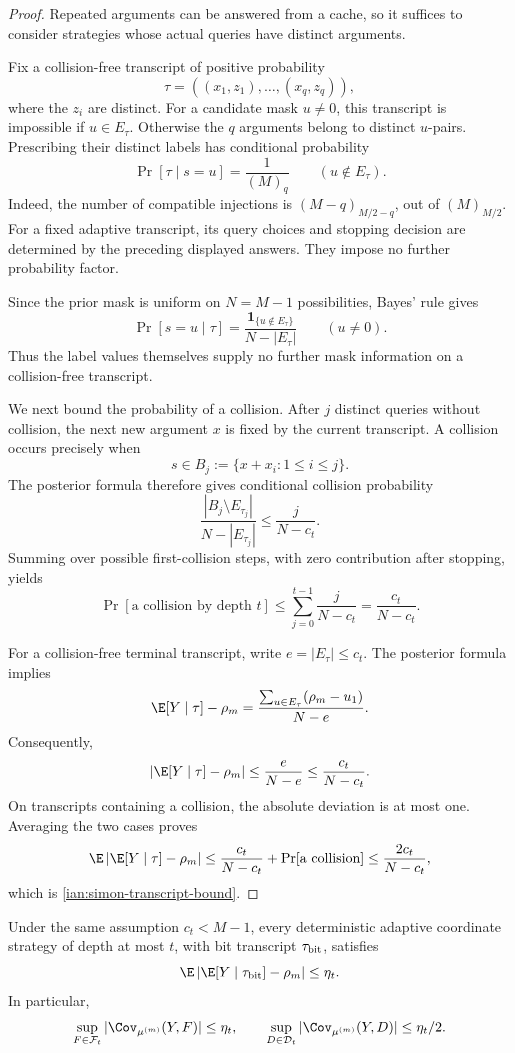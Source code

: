 \begin{proof}
Repeated arguments can be answered from a cache, so it suffices to consider strategies whose actual queries have distinct arguments.

Fix a collision-free transcript of positive probability
\[
 \tau=((x_1,z_1),\ldots,(x_q,z_q)),
\]
where the \(z_i\) are distinct. For a candidate mask \(u\ne0\), this transcript is impossible if \(u\in E_\tau\). Otherwise the \(q\) arguments belong to distinct \(u\)-pairs. Prescribing their distinct labels has conditional probability
\[
 \Pr[\tau\mid s=u]=\frac1{(M)_q}
 \qquad(u\notin E_\tau).
\]
Indeed, the number of compatible injections is
\((M-q)_{M/2-q}\), out of \((M)_{M/2}\).
For a fixed adaptive transcript, its query choices and stopping decision are determined by the preceding displayed answers. They impose no further probability factor.

Since the prior mask is uniform on \(N=M-1\) possibilities, Bayes' rule gives
\[
 \Pr[s=u\mid\tau]
 =\frac{\mathbf1_{\{u\notin E_\tau\}}}{N-|E_\tau|}
 \qquad(u\ne0).
\]
Thus the label values themselves supply no further mask information on a collision-free transcript.

We next bound the probability of a collision. After \(j\) distinct queries without collision, the next new argument \(x\) is fixed by the current transcript. A collision occurs precisely when
\[
 s\in B_j:=\{x+x_i:1\le i\le j\}.
\]
The posterior formula therefore gives conditional collision probability
\[
 \frac{|B_j\setminus E_{\tau_j}|}{N-|E_{\tau_j}|}
 \le\frac{j}{N-c_t}.
\]
Summing over possible first-collision steps, with zero contribution after stopping, yields
\[
 \Pr[\text{a collision by depth }t]
 \le\sum_{j=0}^{t-1}\frac{j}{N-c_t}
 =\frac{c_t}{N-c_t}.
\]

For a collision-free terminal transcript, write \(e=|E_\tau|\le c_t\).
The posterior formula implies
\[
 \E[Y\mid\tau]-\rho_m
 =\frac{\sum_{u\in E_\tau}(\rho_m-u_1)}{N-e}.
\]
Consequently,
\[
 \left|\E[Y\mid\tau]-\rho_m\right|
 \le\frac e{N-e}
 \le\frac{c_t}{N-c_t}.
\]
On transcripts containing a collision, the absolute deviation is at most one. Averaging the two cases proves
\[
 \E\left|\E[Y\mid\tau]-\rho_m\right|
 \le\frac{c_t}{N-c_t}
      +\Pr[\text{a collision}]
 \le\frac{2c_t}{N-c_t},
\]
which is \eqref{ian:simon-transcript-bound}.
\end{proof}

\begin{corollary}\label{ian:simon-bit-hiding}
Under the same assumption \(c_t<M-1\), every deterministic adaptive coordinate strategy of depth at most \(t\), with bit transcript \(\tau_{\rm bit}\), satisfies
\[
 \E\left|\E[Y\mid\tau_{\rm bit}]-\rho_m\right|\le\eta_t.
\]
In particular,
\[
 \sup_{F\in\mathcal F_t}
       |\Cov_{\mu^{(m)}}(Y,F)|\le\eta_t,
 \qquad
 \sup_{D\in\mathcal D_t}
       |\Cov_{\mu^{(m)}}(Y,D)|\le\eta_t/2.
\]
\end{corollary}

